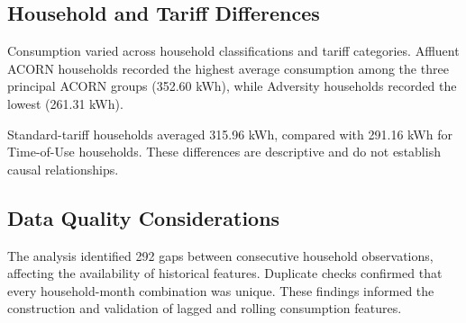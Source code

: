 \documentclass[11pt,a4paper]{article}
\begin{document}
\subsection{Household and Tariff Differences}
Consumption varied across household classifications and tariff categories. Affluent ACORN households recorded the highest average consumption among the three principal ACORN groups (352.60 kWh), while Adversity households recorded the lowest (261.31 kWh).

Standard-tariff households averaged 315.96 kWh, compared with 291.16 kWh for Time-of-Use households. These differences are descriptive and do not establish causal relationships.
\subsection{Data Quality Considerations}
The analysis identified 292 gaps between consecutive household observations, affecting the availability of historical features. Duplicate checks confirmed that every household-month combination was unique. These findings informed the construction and validation of lagged and rolling consumption features.
\end{document}
